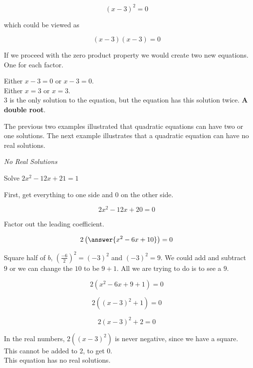 \documentclass{ximera}
\begin{document}
\[  (x - 3)^2 = 0  \]

which could be viewed as 

\[  (x - 3) (x - 3) = 0  \]


If we proceed with the zero product property we would create two new equations.  One for each factor.

Either $x - 3 = 0$   or $x - 3 = 0$. \\

Either $x = 3$ or $x = 3$.  \\

$3$ is the only solution to the equation, but the equation has this solution twice. \textbf{\textcolor{red!80!black}{A double root}}.


The previous two examples illustrated that quadratic equations can have two or one solutions.  The next example illustrates that a quadratic equation can have no real solutions.










\begin{example} \textit{No Real Solutions}

Solve $2 x^2 - 12x + 21 = 1$ \\

\begin{explanation}

First, get everything to one side and $0$ on the other side.



\[  2 x^2 - 12x + 20 = 0  \]

Factor out the leading coefficient.

\[  2 \left( \answer{x^2 - 6x + 10} \right) = 0  \]


Square half of $b$, $\left(\frac{-6}{2}\right)^2 = (-3)^2$ and $(-3)^2 = 9$.  We could add and subtract $9$ or we can change the $10$ to be $9+1$.  All we are trying to do is to see a $9$.



\[  2 (x^2 - 6x + 9 + 1) = 0  \]


\[  2 ((x-3)^2 + 1) = 0  \]


\[  2 (x-3)^2 + 2 = 0  \]

In the real numbers, $2 ((x-3)^2)$ is never negative, since we have a square.  This cannot be added to $2$, to get $0$.  \\


This equation has no real solutions.


\end{explanation}
\end{example}
\end{document}

